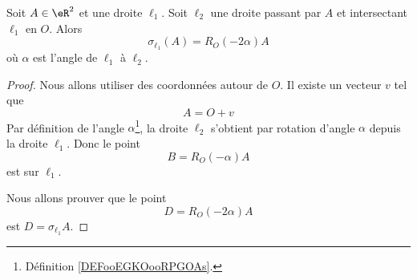 \begin{lemma}        \label{LEMooJLHGooQIpKIE}
    Soit \( A\in \eR^2\) et une droite \( \ell_1\). Soit \( \ell_2\) une droite passant par \( A\) et intersectant \( \ell_1\) en \( O\). Alors
    \begin{equation}
        \sigma_{\ell_1}(A)=R_O(-2\alpha)A
    \end{equation}
    où \( \alpha\) est l'angle de \( \ell_1\) à \( \ell_2\).
\end{lemma}

\begin{proof}
    Nous allons utiliser des coordonnées autour de \( O\). Il existe un vecteur \( v\) tel que
    \begin{equation}
        A=O+v
    \end{equation}
    Par définition de l'angle \( \alpha\)\footnote{Définition \ref{DEFooEGKOooRPGOAs}.}, la droite \( \ell_2\) s'obtient par rotation d'angle \( \alpha\) depuis la droite \( \ell_1\). Donc le point
    \begin{equation}
        B=R_O(-\alpha)A
    \end{equation}
    est sur \( \ell_1\).

    Nous allons prouver que le point
    \begin{equation}
        D=R_O(-2\alpha)A
    \end{equation}
    est \( D=\sigma_{\ell_1}A\).


\end{proof}
